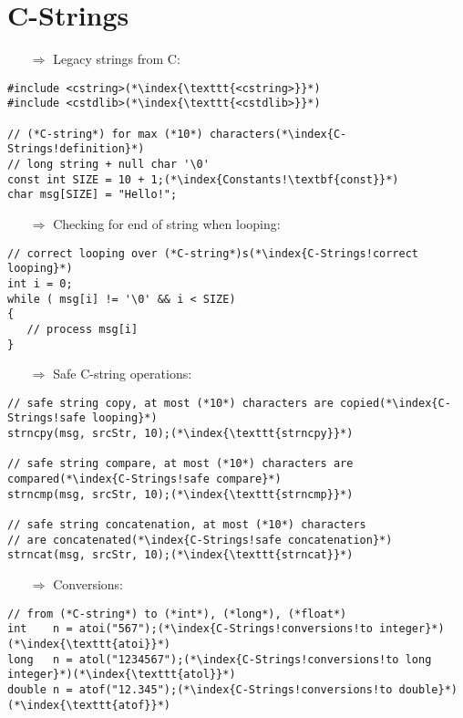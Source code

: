 \documentclass[10pt]{book}
\begin{document}
\section{C-Strings}
\begin{enumerate}
\item[$\Rightarrow$] Legacy strings from C:
\end{enumerate}
\begin{lstlisting}
#include <cstring>(*\index{\texttt{<cstring>}}*)
#include <cstdlib>(*\index{\texttt{<cstdlib>}}*)

// (*C-string*) for max (*10*) characters(*\index{C-Strings!definition}*)
// long string + null char '\0'
const int SIZE = 10 + 1;(*\index{Constants!\textbf{const}}*)
char msg[SIZE] = "Hello!";
\end{lstlisting}
\begin{enumerate}
\item[$\Rightarrow$] Checking for end of string when looping:
\end{enumerate}
\begin{lstlisting}
// correct looping over (*C-string*)s(*\index{C-Strings!correct looping}*)
int i = 0;
while ( msg[i] != '\0' && i < SIZE)
{
   // process msg[i]
}
\end{lstlisting}
\begin{enumerate}
\item[$\Rightarrow$] Safe C-string operations:
\end{enumerate}
\begin{lstlisting}
// safe string copy, at most (*10*) characters are copied(*\index{C-Strings!safe looping}*)
strncpy(msg, srcStr, 10);(*\index{\texttt{strncpy}}*)

// safe string compare, at most (*10*) characters are compared(*\index{C-Strings!safe compare}*)
strncmp(msg, srcStr, 10);(*\index{\texttt{strncmp}}*)

// safe string concatenation, at most (*10*) characters
// are concatenated(*\index{C-Strings!safe concatenation}*)
strncat(msg, srcStr, 10);(*\index{\texttt{strncat}}*)
\end{lstlisting}
\begin{enumerate}
\item[$\Rightarrow$] Conversions:
\end{enumerate}
\begin{lstlisting}
// from (*C-string*) to (*int*), (*long*), (*float*)
int    n = atoi("567");(*\index{C-Strings!conversions!to integer}*)(*\index{\texttt{atoi}}*)
long   n = atol("1234567");(*\index{C-Strings!conversions!to long integer}*)(*\index{\texttt{atol}}*)
double n = atof("12.345");(*\index{C-Strings!conversions!to double}*)(*\index{\texttt{atof}}*)
\end{lstlisting}
%
%
\end{document}
